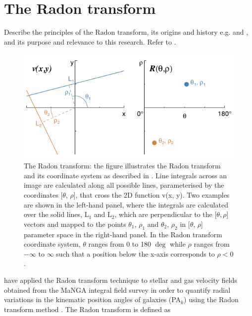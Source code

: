 \section{The Radon transform}
Describe the principles of the Radon transform, its origins and history e.g. \citet{radon1917determination} and  \citet{7910dc8d5b654c90ac4bc94c67d06f01}, and its purpose and relevance to this research. Refer to \cite{2018MNRAS.480.2217S}.

\begin{figure}
    \centering
    \includegraphics[width=\columnwidth]{images/RadonPlots/Radon-transform-Stark.png}
    \caption{The Radon transform: the figure illustrates the Radon transform and its coordinate system as described in \citet{2018MNRAS.480.2217S}. Line integrals across an image are calculated along all possible lines, parameterised by the coordinates [$\theta$, $\rho$], that cross the 2D function v(x, y). Two examples are shown in the left-hand panel, where the integrals are calculated over the solid lines, L$_1$ and L$_2$, which are perpendicular to the [$\theta, \rho$] vectors and mapped to the points $\theta_1$, $\rho_1$ and $\theta_2$, $\rho_2$ in [$\theta$, $\rho$] parameter space in the right-hand panel. In the Radon transform coordinate system, $\theta$ ranges from 0 to 180 $\deg$ while $\rho$ ranges from $-\infty$ to $\infty$  such that a position below the x-axis corresponds to $\rho < 0$.}
    \label{fig:RadonTransform}
\end{figure}

\citet{2018MNRAS.480.2217S} have applied the Radon transform technique to stellar and gas velocity fields obtained from the MaNGA integral field survey in order to quantify radial variations in the kinematic position angles of galaxies (PA$_k$) using the Radon transform method \citep[see e.g.][]{radon1917determination, 7910dc8d5b654c90ac4bc94c67d06f01}. 
The Radon transform is defined as

